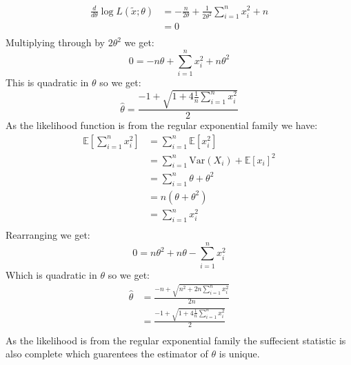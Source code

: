 \documentclass{article}
\begin{document}
\begin{align*}
\frac{d}{d\theta} \log L(\tilde{x};\theta)&=-\frac{n}{2\theta}+\frac{1}{2\theta^2}\sum_{i=1}^{n}x_i^2+n\\
&=0\\
\end{align*}
Multiplying through by $2\theta^2$ we get:
$$0=-n\theta+\sum_{i=1}^{n}x_i^2+n\theta^2$$
This is quadratic in $\theta$ so we get:
$$\hat{\theta}=\frac{-1+\sqrt{1+4\frac{1}{n}\sum_{i=1}^nx_i^2}}{2}$$
As the likelihood function is from the regular exponential family we have:
\begin{align*}
\mathbb{E}\left[\sum_{i=1}^nx_i^2\right]&=\sum_{i=1}^n\mathbb{E}\left[x_i^2\right]\\
&=\sum_{i=1}^n\text{Var}(X_i)+\mathbb{E}\left[x_i\right]^2\\
&=\sum_{i=1}^n\theta+\theta^2\\
&=n(\theta+\theta^2)\\
&=\sum_{i=1}^nx_i^2\\
\end{align*}
Rearranging we get:
$$0=n\theta^2+n\theta-\sum_{i=1}^nx_i^2$$
Which is quadratic in $\theta$ so we get:
\begin{align*}
\hat{\theta}&=\frac{-n+\sqrt{n^2+2n\sum_{i=1}^nx_i^2}}{2n}\\
&=\frac{-1+\sqrt{1+4\frac{1}{n}\sum_{i=1}^nx_i^2}}{2}\\
\end{align*}
As the likelihood is from the regular exponential family the suffecient statistic is also complete which guarentees the estimator of $\theta$ is unique. 
\end{document}
